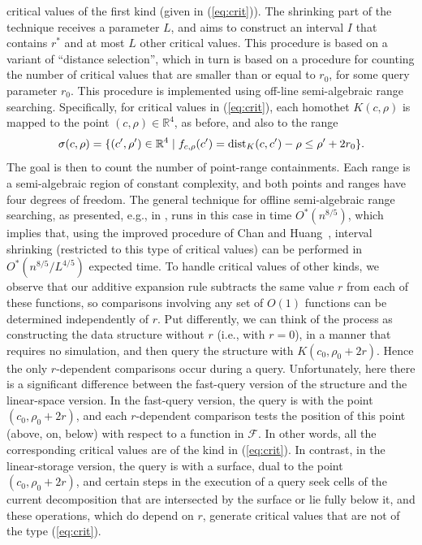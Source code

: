 \documentclass[11pt]{article}
\def\reals{{\mathbb R}}
\def\dist{{\rm dist}}
\def\F{\mathcal{F}}
\theoremstyle{definition}
\begin{document}
critical values of the first kind (given in (\ref{eq:crit})). 
%
The shrinking part of the technique receives a parameter $L$, and aims to construct an interval $I$
that contains $r^*$ and at most $L$ other critical values. This procedure is based on a variant 
of ``distance selection'', which in turn is based on a procedure for counting the number of 
critical values that are smaller than or equal to $r_0$, for some query parameter $r_0$. 
This procedure is implemented using off-line semi-algebraic range searching. 
Specifically, for critical values in (\ref{eq:crit}), each homothet
$K(c,\rho)$ is mapped to the point $(c,\rho)\in\reals^4$, as before, and also to the range
\[
\sigma(c,\rho) = \{ (c',\rho') \in\reals^4 \mid f_{c,\rho}(c') = \dist_K(c,c') - \rho \le \rho' + 2r_0 \} .
\]
The goal is then to count the number of point-range containments. Each range is a semi-algebraic region
of constant complexity, and both points and ranges have four degrees of freedom. The general technique
for offline semi-algebraic range searching, as presented, e.g., in \cite[Appendix]{AAEKS}, runs in
this case in time $O^*(n^{8/5})$, which implies that, using the improved procedure 
of Chan and Huang~\cite{CH}, interval shrinking (restricted to this type of critical values)
can be performed in $O^*(n^{8/5}/L^{4/5})$ expected time.
%
To handle critical values of other kinds, we observe that our additive expansion rule
subtracts the same value $r$ from each of these functions, so comparisons involving any 
set of $O(1)$ functions can be determined independently of $r$. Put differently, we can
think of the process as constructing the data structure without $r$ (i.e., with $r=0$),
in a manner that requires no simulation, and then query the structure with $K(c_0,\rho_0+2r)$.
Hence the only $r$-dependent comparisons occur during a query.
%
Unfortunately, here there is a significant difference between the fast-query version of
the structure and the linear-space version. In the fast-query version, the query is with 
the point $(c_0,\rho_0+2r)$, and each $r$-dependent comparison tests the position of this point
(above, on, below) with respect to a function in $\F$. In other words, all the corresponding
critical values are of the kind in (\ref{eq:crit}). In contrast, in the linear-storage version, 
the query is with a surface, dual to the point $(c_0,\rho_0+2r)$, and certain steps in the 
execution of a query seek cells of the current decomposition that are intersected
by the surface or lie fully below it, and these operations, which do depend on $r$, generate
critical values that are not of the type (\ref{eq:crit}).
\end{document}
